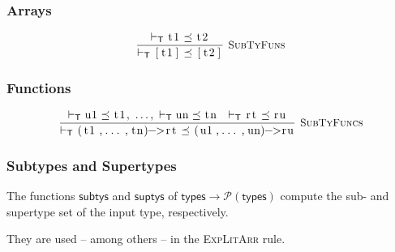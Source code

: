 \documentclass{article}
\newcommand{\code}[1]{\lstinline[columns=fixed]{#1}}
\newcommand{\drmrule}[5]{\frac{#1}{#2\vdash_{\mathsf{#3}}#4}\textsc{\ \small{#5}}}
\newcommand{\ruleapp}[1]{\vdash_{\mathsf{#1}}}
\newcommand{\mc}[1]{\textnormal{\code{#1}}}
\begin{document}
			\subsubsection{Arrays}
			
				\begin{align*}
					\drmrule{\ruleapp{T}\mc{t1}\preceq\mc{t2}}{}{T}{\mc{[t1]}\preceq\mc{[t2]}}{SubTyFuns}
				\end{align*}
		
			\subsubsection{Functions}
			
				\begin{align*}
					\drmrule{\ruleapp{T}\mc{u1}\preceq\mc{t1},\ \dots,\ \ruleapp{T}\mc{un}\preceq\mc{tn}\ \ \ruleapp{T}\mc{rt}\preceq\mc{ru}}{}{T}{\mc{(t1,...,tn)->rt} \preceq \mc{(u1,...,un)->ru}}{SubTyFuncs}
				\end{align*}
				
			\subsubsection{Subtypes and Supertypes}
			
				The functions $\mathsf{subtys}$ and $\mathsf{suptys}$ of $\mathsf{types}\to\mathcal{P}(\mathsf{types})$ compute the sub- and supertype set of the input type, respectively.
				
				They are used -- among others -- in the \textsc{ExpLitArr} rule.
				
\end{document}
